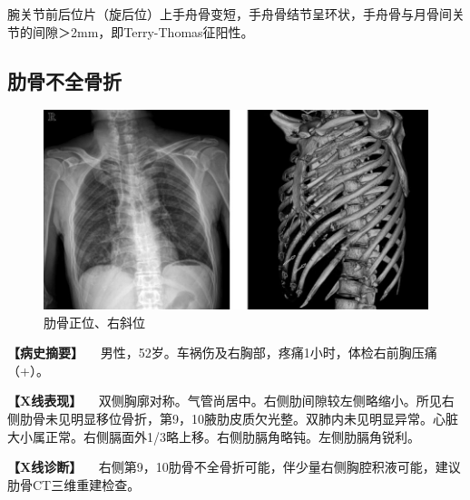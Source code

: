 腕关节前后位片（旋后位）上手舟骨变短，手舟骨结节呈环状，手舟骨与月骨间关节的间隙＞2mm，即Terry-Thomas征阳性。

\subsection{肋骨不全骨折}

\begin{figure}[!htbp]
 \centering
 \includegraphics{./images/Image00041.jpg}
 \captionsetup{justification=centering}
 \caption{肋骨正位、右斜位}
 \label{fig2-3-14}
  \end{figure} 

\textbf{【病史摘要】}
　男性，52岁。车祸伤及右胸部，疼痛1小时，体检右前胸压痛（+）。

\textbf{【X线表现】}
　双侧胸廓对称。气管尚居中。右侧肋间隙较左侧略缩小。所见右侧肋骨未见明显移位骨折，第9，10腋肋皮质欠光整。双肺内未见明显异常。心脏大小属正常。右侧膈面外1/3略上移。右侧肋膈角略钝。左侧肋膈角锐利。

\textbf{【X线诊断】}
　右侧第9，10肋骨不全骨折可能，伴少量右侧胸腔积液可能，建议肋骨CT三维重建检查。

